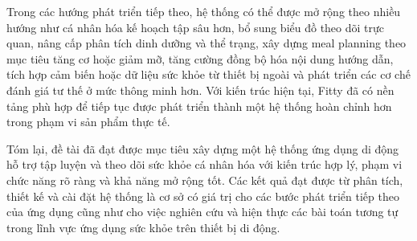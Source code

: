 Trong các hướng phát triển tiếp theo, hệ thống có thể được mở rộng theo nhiều hướng như cá nhân hóa kế hoạch tập sâu hơn, bổ sung biểu đồ theo dõi trực quan, nâng cấp phân tích dinh dưỡng và thể trạng, xây dựng meal planning theo mục tiêu tăng cơ hoặc giảm mỡ, tăng cường đồng bộ hóa nội dung hướng dẫn, tích hợp cảm biến hoặc dữ liệu sức khỏe từ thiết bị ngoài và phát triển các cơ chế đánh giá tư thế ở mức thông minh hơn. Với kiến trúc hiện tại, Fitty đã có nền tảng phù hợp để tiếp tục được phát triển thành một hệ thống hoàn chỉnh hơn trong phạm vi sản phẩm thực tế.

Tóm lại, đề tài đã đạt được mục tiêu xây dựng một hệ thống ứng dụng di động hỗ trợ tập luyện và theo dõi sức khỏe cá nhân hóa với kiến trúc hợp lý, phạm vi chức năng rõ ràng và khả năng mở rộng tốt. Các kết quả đạt được từ phân tích, thiết kế và cài đặt hệ thống là cơ sở có giá trị cho các bước phát triển tiếp theo của ứng dụng cũng như cho việc nghiên cứu và hiện thực các bài toán tương tự trong lĩnh vực ứng dụng sức khỏe trên thiết bị di động.
